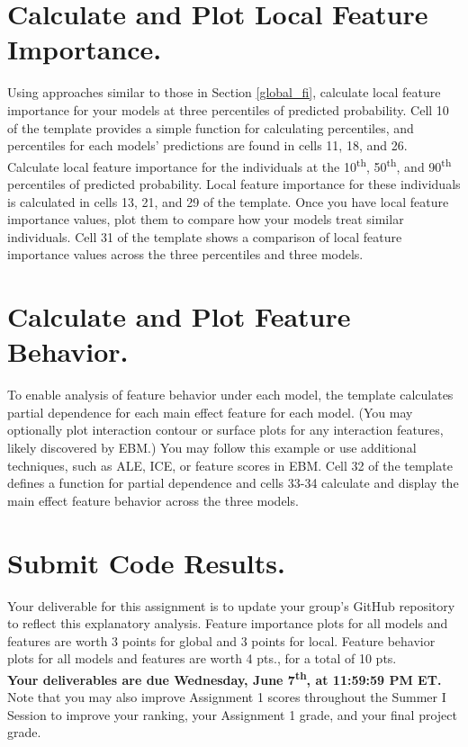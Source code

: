 \documentclass[fleqn]{article}
\begin{document}
\section{Calculate and Plot Local Feature Importance.}\label{local_fi}

Using approaches similar to those in Section \ref{global_fi}, calculate local feature importance for your models at three percentiles of predicted probability. Cell 10 of the template provides a simple function for calculating percentiles, and percentiles for each models' predictions are found in cells 11, 18, and 26.\\

\noindent Calculate local feature importance for the individuals at the 10\textsuperscript{th}, 50\textsuperscript{th}, and 90\textsuperscript{th} percentiles of predicted probability. Local feature importance for these individuals is calculated in cells 13, 21, and 29 of the template. Once you have local feature importance values, plot them to compare how your models treat similar individuals. Cell 31 of the template shows a comparison of local feature importance values across the three percentiles and three models.

\section{Calculate and Plot Feature Behavior.}

To enable analysis of feature behavior under each model, the template calculates partial dependence for each main effect feature for each model. (You may optionally plot interaction contour or surface plots for any interaction features, likely discovered by EBM.) You may follow this example or use additional techniques, such as ALE, ICE, or feature scores in EBM. Cell 32 of the template defines a function for partial dependence and cells 33-34 calculate and display the main effect feature behavior across the three models. 

\section{Submit Code Results.}

Your deliverable for this assignment is to update your group's GitHub repository to reflect this explanatory analysis. Feature importance plots for all models and features are worth 3 points for global and 3 points for local. Feature behavior plots for all models and features are worth 4 pts., for a total of 10 pts.\\

\noindent \textbf{Your deliverables are due Wednesday, June 7\textsuperscript{th}, at 11:59:59 PM ET.}\\

\noindent Note that you may also improve Assignment 1 scores throughout the Summer I Session to improve your ranking, your Assignment 1 grade, and your final project grade.
\end{document}

